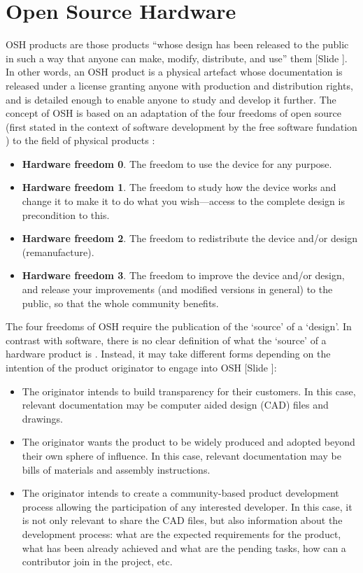 \documentclass{article}
\newcounter{slide}
\begin{document}
\section{Open Source Hardware}
\label{sec:osh}
OSH products are those products ``whose design has been released to the public in such a way that anyone can make, modify, distribute, and use'' them \cite{opensourcehardwareassociationOpenSourceHardware2016} {\color{blue}[Slide ]}. In other words, an OSH product is a physical artefact whose documentation is released under a license granting anyone with production and distribution rights, and is detailed enough to enable anyone to study and develop it further. The concept of OSH is based on an adaptation of the four freedoms of open source (first stated in the context of software development by the free software fundation \cite{freesoftwarefoundationFreeSoftwareDefinition2015}) to the field of physical products \cite{powellDemocratizingProductionOpen2012}: 
\begin{itemize}
	\item \textbf{Hardware freedom 0}. The freedom to use the device for any purpose.
	\item \textbf{Hardware freedom 1}. The freedom to study how the device works and change it to make it to do what you wish---access to the complete design is precondition to this.
	\item \textbf{Hardware freedom 2}. The freedom to redistribute the device and/or design (remanufacture).
	\item \textbf{Hardware freedom 3}. The freedom to improve the device and/or design, and release your improvements (and modified versions in general) to the public, so that the whole community benefits.
\end{itemize}

The four freedoms of OSH require the publication of the `source' of a `design'. In contrast with software, there is no clear definition of what the `source' of a hardware product is \cite{bonvoisinWhatSourceOpen2017}. Instead, it may take different forms depending on the intention of the product originator to engage into OSH {\color{blue}[Slide ]}:
\begin{itemize}
  \item The originator intends to build transparency for their customers. In this case, relevant documentation may be computer aided design (CAD) files and drawings.
  \item The originator wants the product to be widely produced and adopted beyond their own sphere of influence. In this case, relevant documentation may be bills of materials and assembly instructions.
  \item The originator intends to create a community-based product development process allowing the participation of any interested developer. In this case, it is not only relevant to share the CAD files, but also information about the development process: what are the expected requirements for the product, what has been already achieved and what are the pending tasks, how can a contributor join in the project, etc.
\end{itemize}
\end{document}

